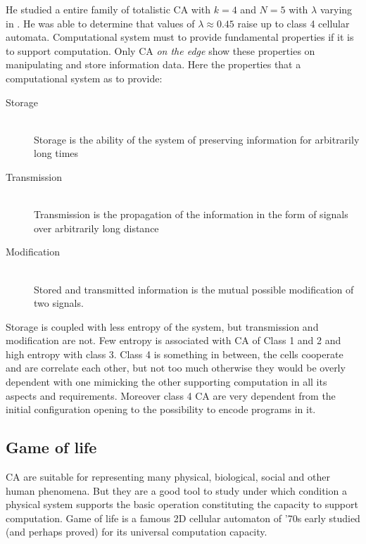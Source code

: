 He studied a entire family of totalistic CA with \begin{math}k=4
\end{math} and \begin{math}N=5\end{math} with \begin{math}\lambda\end{math}
varying in \begin{math}[0,0.75]\end{math}. He was able to determine that values
of \begin{math}\lambda\approx0.45\end{math} raise up to class 4 cellular
automata.
Computational system must to provide fundamental properties if it is
to support computation. Only CA  \emph{on the edge} show these properties on
manipulating and store information data.
Here the properties that a computational system as to provide:
\begin{description}
  \item[Storage] \hfill \\
  Storage is the ability of the system of preserving information for
arbitrarily long times
  \item[Transmission] \hfill \\
  Transmission is the propagation of the information in the
form of signals over arbitrarily long distance
  \item[Modification] \hfill \\
Stored and transmitted
information is the mutual possible modification of two signals.

\end{description}

Storage is coupled with less entropy of the system, but transmission and
modification are not. Few entropy is associated with CA of Class 1 and 2 and
high entropy with class 3. Class 4 is something in between, the cells cooperate
and are correlate each other, but not too much otherwise they would be overly
dependent with one mimicking the other supporting computation in all its aspects
and requirements. Moreover class 4 CA are very dependent from the initial
configuration opening to the possibility to encode programs in it.

\subsection{Game of life}\label{sect:GOL}
CA are suitable for representing many physical, biological, social and other
human phenomena. But they are a good tool to study under which condition a
physical system supports the basic operation constituting the capacity to
support computation. Game of life is a famous 2D
cellular automaton of '70s early studied (and perhaps proved) for its universal
computation capacity.



